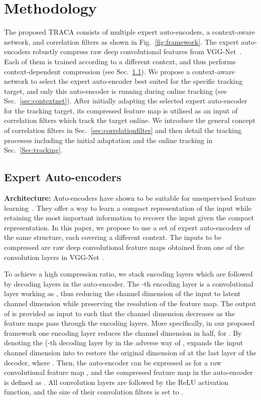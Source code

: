\documentclass[10pt,twocolumn,letterpaper]{article}
\begin{document}
 \section{Methodology}
The proposed \ac{TRACA} consists of multiple expert auto-encoders, a context-aware network, and correlation filters as shown in Fig.~\ref{fig:framework}. The expert auto-encoders robustly compress raw deep convolutional features from VGG-Net~\cite{ref:vggm}.
Each of them is trained according to a different context, and thus performs context-dependent compression (see Sec.~\ref{sec:expertae}).
We propose a context-aware network to select the expert auto-encoder best suited for the specific tracking target, and only this auto-encoder is running during online tracking (see Sec.~\ref{sec:contextnet}).
After initially adapting the selected expert auto-encoder for the tracking target, its compressed feature map is utilised as an input of correlation filters which track the target online. 
We introduce the general concept of correlation filters in Sec.~\ref{sec:correlationfilter} and then detail the tracking processes including the initial adaptation and the online tracking in Sec.~\ref{Sec:tracking}.











 \subsection{Expert Auto-encoders} \label{sec:expertae}

\textbf{Architecture:}
Auto-encoders have shown to be suitable for unsupervised feature learning~\cite{ref:ae_hinton2006,ref:ae_hinton2006_2,ref:dAE}.
They offer a way to learn a compact representation of the input while retaining the most important information to recover the input given the compact representation.
In this paper, we propose to use a set of  expert auto-encoders of the same structure, each covering a different context. 
The inputs to be compressed are raw deep convolutional feature maps obtained from one of the convolution layers in VGG-Net~\cite{ref:vggm}.

To achieve a high compression ratio, we stack  encoding layers which are followed by  decoding layers in the auto-encoder.
The -th encoding layer  is a convolutional layer working as , thus reducing the channel dimension  of the input to latent channel dimension  while preserving the resolution of the feature map.
The output of  is provided as input to  such that the channel dimension  decreases as the feature maps pass through the encoding layers.
More specifically, in our proposed framework one encoding layer reduces the channel dimension in half, \ie  for .
By denoting the (-th decoding layer by  in the adverse way of ,  expands the input channel dimension  into  to restore the original dimension  of  at the last layer of the decoder, where . 
Then, the auto-encoder  can be expressed as  for a raw convolutional feature map
, and the compressed feature map in the auto-encoder is defined as .
All convolution layers are followed by the ReLU activation function, and the size of their convolution filters is set to .
\end{document}
